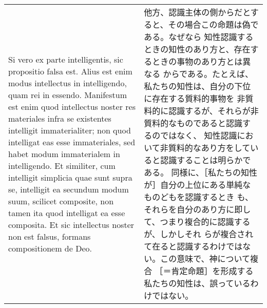 \documentclass[10pt]{jsarticle}
\begin{document}
\begin{longtable}{p{21em}p{21em}}
\\

Si vero ex parte intelligentis, sic propositio falsa est. Alius est
enim modus intellectus in intelligendo, quam rei in
essendo. Manifestum est enim quod intellectus noster res materiales
infra se existentes intelligit immaterialiter; non quod intelligat eas
esse immateriales, sed habet modum immaterialem in intelligendo. Et
similiter, cum intelligit simplicia quae sunt supra se, intelligit ea
secundum modum suum, scilicet composite, non tamen ita quod intelligat
ea esse composita. Et sic intellectus noster non est falsus, formans
compositionem de Deo.

&

他方、認識主体の側からだとすると、その場合この命題は偽である。なぜなら
知性認識するときの知性のあり方と、存在するときの事物のあり方とは異なる
からである。たとえば、私たちの知性は、自分の下位に存在する質料的事物を
非質料的に認識するが、それらが非質料的なものであると認識するのではなく、
知性認識において非質料的なあり方をしていると認識することは明らかである。
同様に、［私たちの知性が］自分の上位にある単純なものどもを認識するとき
も、それらを自分のあり方に即して、つまり複合的に認識するが、しかしそれ
らが複合されて在ると認識するわけではない。この意味で、神について複合
［＝肯定命題］を形成する私たちの知性は、誤っているわけではない。

\end{longtable}
\end{document}
